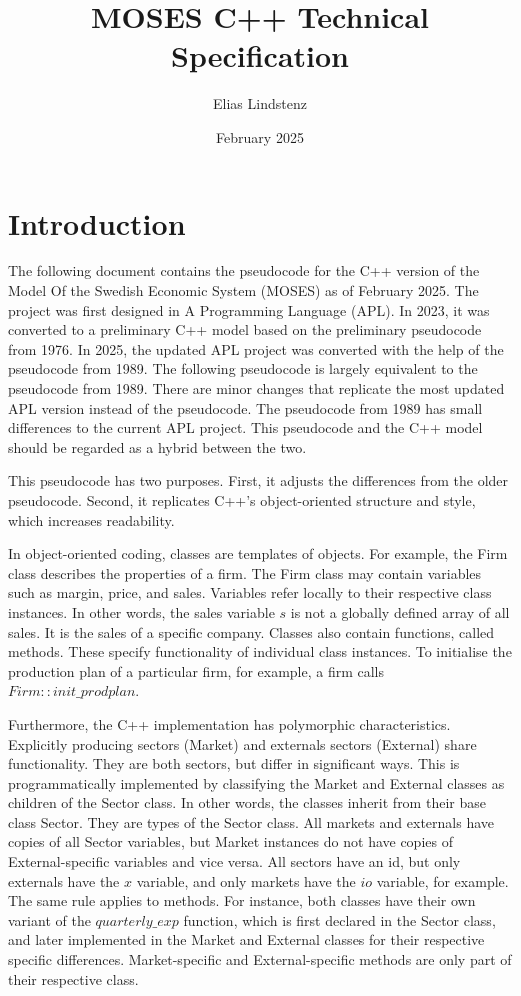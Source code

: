 \documentclass{article}
\title{MOSES C++ Technical Specification}
\author{Elias Lindstenz}
\date{February 2025}
\begin{document}
\maketitle
\clearpage

\tableofcontents
\clearpage

\section{Introduction}
The following document contains the pseudocode for the C++ version of the Model Of the Swedish Economic System (MOSES) as of February 2025. The project was first designed in A Programming Language (APL). In 2023, it was converted to a preliminary C++ model based on the preliminary pseudocode from 1976. In 2025, the updated APL project was converted with the help of the pseudocode from 1989. The following pseudocode is largely equivalent to the pseudocode from 1989. There are minor changes that replicate the most updated APL version instead of the pseudocode. The pseudocode from 1989 has small differences to the current APL project. This pseudocode and the C++ model should be regarded as a hybrid between the two.

This pseudocode has two purposes. First, it adjusts the differences from the older pseudocode. Second, it replicates C++'s object-oriented structure and style, which increases readability.

In object-oriented coding, classes are templates of objects. For example, the Firm class describes the properties of a firm. The Firm class may contain variables such as margin, price, and sales. Variables refer locally to their respective class instances. In other words, the sales variable $s$ is not a globally defined array of all sales. It is the sales of a specific company. Classes also contain functions, called methods. These specify functionality of individual class instances. To initialise the production plan of a particular firm, for example, a firm calls $Firm::init\_prodplan$.

Furthermore, the C++ implementation has polymorphic characteristics. Explicitly producing sectors (Market) and externals sectors (External) share functionality. They are both sectors, but differ in significant ways. This is programmatically implemented by classifying the Market and External classes as children of the Sector class. In other words, the classes inherit from their base class Sector. They are types of the Sector class. All markets and externals have copies of all Sector variables, but Market instances do not have copies of External-specific variables and vice versa. All sectors have an id, but only externals have the $x$ variable, and only markets have the $io$ variable, for example. The same rule applies to methods. For instance, both classes have their own variant of the $quarterly\_exp$ function, which is first declared in the Sector class, and later implemented in the Market and External classes for their respective specific differences. Market-specific and External-specific methods are only part of their respective class.
\end{document}
